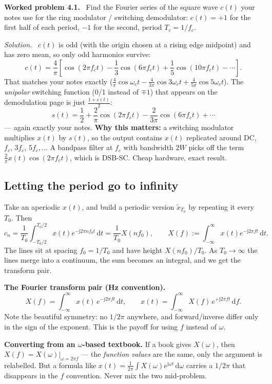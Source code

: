 \documentclass[11pt,a4paper]{article}
\newcommand{\dd}{\,\mathrm{d}}
\newcommand{\ii}{\mathrm{j}}
\newenvironment{worked}[1]{\par\vspace{4pt}\noindent\textbf{\color{warmred}Worked problem #1.}\ \ignorespaces}{\par\vspace{4pt}}
\newcommand{\soln}{\par\vspace{2pt}\noindent\textit{Solution.}\ \ignorespaces}
\begin{document}
\begin{worked}{4.1}
Find the Fourier series of the square wave $c(t)$ your notes use for the ring modulator / switching
demodulator: $c(t)=+1$ for the first half of each period, $-1$ for the second, period $T_c=1/f_c$.
\end{worked}
\soln
$c(t)$ is odd (with the origin chosen at a rising edge midpoint) and has zero mean, so only odd harmonics
survive:
\[
c(t)=\frac{4}{\pi}\left[\cos(2\pi f_ct)-\frac13\cos(6\pi f_ct)+\frac15\cos(10\pi f_ct)-\cdots\right].
\]
That matches your notes exactly ($\frac4\pi\cos\omega_ct-\frac{4}{3\pi}\cos3\omega_ct+\frac{4}{5\pi}\cos5\omega_ct$).
The \emph{unipolar} switching function (0/1 instead of $\mp1$) that appears on the demodulation page is just
$\frac{1+c(t)}{2}$:
\[
s(t)=\frac12+\frac{2}{\pi}\cos(2\pi f_ct)-\frac{2}{3\pi}\cos(6\pi f_ct)+\cdots
\]
--- again exactly your notes. \textbf{Why this matters:} a switching modulator multiplies $x(t)$ by $s(t)$, so
the output contains $x(t)$ replicated around DC, $f_c$, $3f_c$, $5f_c,\dots$ A bandpass filter at $f_c$ with
bandwidth $2W$ picks off the term $\frac{2}{\pi}x(t)\cos(2\pi f_ct)$, which is DSB-SC. Cheap hardware, exact
result.

\subsection{Letting the period go to infinity}
Take an aperiodic $x(t)$, and build a periodic version $\tilde x_{T_0}$ by repeating it every $T_0$. Then
\[
c_n=\frac{1}{T_0}\int_{-T_0/2}^{T_0/2}x(t)e^{-\ii2\pi nf_0t}\dd t=\frac{1}{T_0}X(nf_0),
\qquad X(f):=\int_{-\infty}^{\infty}x(t)e^{-\ii2\pi ft}\dd t .
\]
The lines sit at spacing $f_0=1/T_0$ and have height $X(nf_0)/T_0$. As $T_0\to\infty$ the lines merge into a
continuum, the sum becomes an integral, and we get the transform pair.

\begin{keybox}
\textbf{The Fourier transform pair (Hz convention).}
\[
X(f)=\int_{-\infty}^{\infty}x(t)\,e^{-\ii2\pi f t}\dd t,
\qquad
x(t)=\int_{-\infty}^{\infty}X(f)\,e^{+\ii2\pi f t}\dd f .
\]
Note the beautiful symmetry: no $1/2\pi$ anywhere, and forward/inverse differ only in the sign of the exponent.
This is the payoff for using $f$ instead of $\omega$.
\end{keybox}

\begin{trapbox}
\textbf{Converting from an $\omega$-based textbook.} If a book gives $X(\omega)$, then $X(f)=X(\omega)\big|_{\omega=2\pi f}$
--- the \emph{function values} are the same, only the argument is relabelled. But a formula like
$x(t)=\frac{1}{2\pi}\int X(\omega)e^{\ii\omega t}\dd\omega$ carries a $1/2\pi$ that disappears in the $f$
convention. Never mix the two mid-problem.
\end{trapbox}
\end{document}
